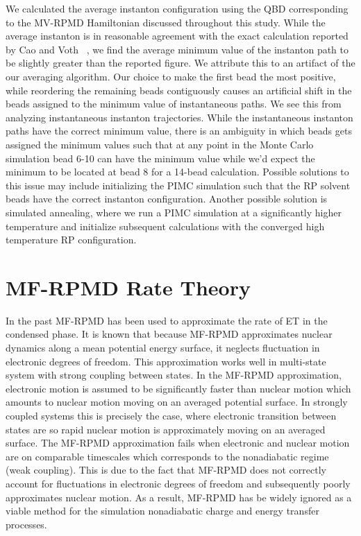 \documentclass[phd,tocprelim]{cornell}
\begin{document}
We calculated the average instanton configuration using the QBD corresponding to the MV-RPMD Hamiltonian discussed throughout this study. While the average instanton is in reasonable agreement with the exact calculation reported by Cao and Voth ~\cite{CAO1995}, we find the average minimum value of the instanton path to be slightly greater than the reported figure. We attribute this to an artifact of the our averaging algorithm. Our choice to make the first bead the most positive, while reordering the remaining beads contiguously causes an artificial shift in the beads assigned to the minimum value of instantaneous paths. We see this from analyzing instantaneous instanton trajectories. While the instantaneous instanton paths have the correct minimum value, there is an ambiguity in which beads gets assigned the minimum values such that at any point in the Monte Carlo simulation bead 6-10 can have the minimum value while we'd expect the minimum to be located at bead 8 for a 14-bead calculation. Possible solutions to this issue may include initializing the PIMC simulation such that the RP solvent beads have the correct instanton configuration. Another possible solution is simulated annealing, where we run a PIMC simulation at a significantly higher temperature and initialize subsequent calculations with the converged high temperature RP configuration.

\section{MF-RPMD Rate Theory}
In the past MF-RPMD has been used to approximate the rate of ET in the condensed phase. It is known that because MF-RPMD approximates nuclear dynamics along a mean potential energy surface, it neglects fluctuation in electronic degrees of freedom. This approximation works well in multi-state system with strong coupling between states. In the MF-RPMD approximation, electronic motion is assumed to be significantly faster than nuclear motion which amounts to nuclear motion moving on an averaged potential surface. In strongly coupled systems this is precisely the case, where electronic transition between states are so rapid nuclear motion is approximately moving on an averaged surface. The MF-RPMD approximation fails when electronic and nuclear motion are on comparable timescales which corresponds to the nonadiabatic regime (weak coupling). This is due to the fact that MF-RPMD does not correctly account for fluctuations in electronic degrees of freedom and subsequently poorly approximates nuclear motion. As a result, MF-RPMD has be widely ignored as a viable method for the simulation nonadiabatic charge and energy transfer processes. 
\end{document}
